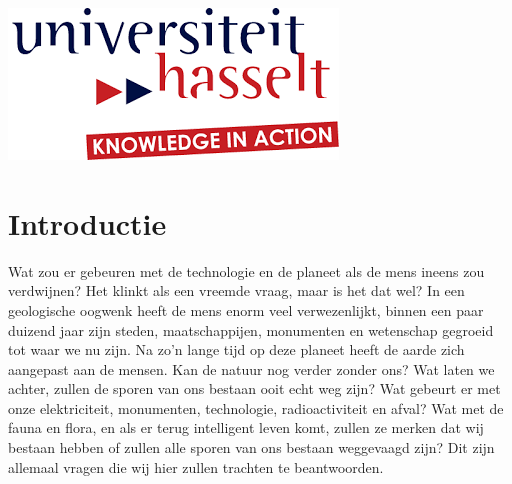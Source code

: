 \begin{titlepage}
\includegraphics{logo.png}\\[1cm] %
 

\vfill %

\end{titlepage}

\tableofcontents
\newpage

\section{Introductie}
Wat zou er gebeuren met de technologie en de planeet als de mens ineens zou verdwijnen? Het klinkt als een vreemde vraag, maar is het dat wel? In een geologische oogwenk heeft de mens enorm veel verwezenlijkt, binnen een paar duizend jaar zijn steden, maatschappijen, monumenten en wetenschap gegroeid tot waar we nu zijn.\newline\newline
Na zo'n lange tijd op deze planeet heeft de aarde zich aangepast aan de mensen. Kan de natuur nog verder zonder ons? Wat laten we achter, zullen de sporen van ons bestaan ooit echt weg zijn? Wat gebeurt er met onze elektriciteit, monumenten, technologie, radioactiviteit en afval? Wat met de fauna en flora, en als er terug intelligent leven komt, zullen ze merken dat wij bestaan hebben of zullen alle sporen van ons bestaan weggevaagd zijn? Dit zijn allemaal vragen die wij hier zullen trachten te beantwoorden.

